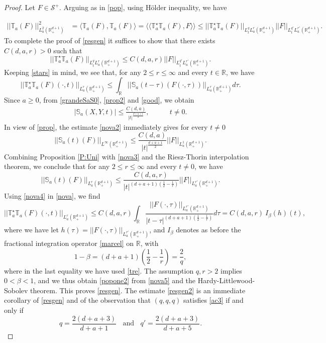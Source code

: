 \documentclass[11pt,letter]{amsart}
\def \RN {\mathbb{R}_+^{d+1}}
\def \R {\mathbb{R}}
\numberwithin{equation}{section}
\newcommand{\sa}{\langle}
\newcommand{\da}{\rangle}
\newcommand{\snn}{\mathscr S^+}
\numberwithin{equation}{section}
\begin{document}
\begin{proof}
Let $F\in \snn$. Arguing as in \eqref{pop}, using H\"older inequality, we have

\begin{align}\label{popone}
||\mathbb T_a(F)||^2_{L_a^2(\RN)} & = \sa \mathbb T_a(F),\mathbb T_a(F)\da = \sa\sa \mathbb T_a^\star \mathbb T_a(F),F\da\da \le ||\mathbb T_a^\star \mathbb T_a(F)||_{L^q_t L_a^r(\RN)} ||F||_{L^{q'}_t L^{r'}_a(\RN)}.
\end{align}
To complete the proof of \eqref{resgen} it suffices to show that there exists $C(d,a,r)>0$ such that 
\begin{equation}\label{popone2}
||\mathbb T_a^\star \mathbb T_a(F)||_{L^q_t L_a^r(\RN)} \le C(d,a,r) ||F||_{L^{q'}_t L^{r'}_a(\RN)}.
\end{equation}
Keeping \eqref{stars} in mind, we see that, for any $2\le r\le \infty$ and every $t\in \R$, we have 
\begin{equation}\label{nova}
||\mathbb T_a^\star \mathbb T_a(F)(\cdot,t)||_{L^r_a(\RN)} \le \int_\R ||\mathbb S_a(t-\tau)(F(\cdot,\tau))||_{L^r_a(\RN)} d\tau.
\end{equation}
Since $a\ge 0$, from \eqref{grandeSaS0}, \eqref{prop2} and \eqref{good}, we obtain
\begin{align}\label{nova2}
|\mathbb S_a(X,Y,t)|
\le 
\frac{C(d,a)}{|t|^{\frac{d+a+1}{2}}},
\qquad \ \ \ \ t\neq 0.
\end{align}
In view of \eqref{prop}, the estimate \eqref{nova2}  immediately gives for every $t\not= 0$
\begin{equation}\label{nova3}
||\mathbb S_a(t)(F)||_{L^\infty(\RN)} \le \frac{C(d,a)}{|t|^{\frac{d+a+1}{2}}} ||F||_{L^1_a(\RN)}.
\end{equation}
Combining Proposition \ref{P:Uni} with \eqref{nova3} and the Riesz-Thorin interpolation theorem, we conclude that for any $2\le r\le \infty$ and every $t\not= 0$, we have
\begin{equation}\label{nova4}
||\mathbb S_a(t)(F)||_{L^r_a(\RN)} \le \frac{C(d,a,r)}{|t|^{(d+a+1)(\frac{1}{2}-\frac 1r)}} ||F||_{L^{r'}_a(\RN)}.
\end{equation}
Using \eqref{nova4} in \eqref{nova}, we find
\begin{equation}\label{nova5}
||\mathbb T_a^\star \mathbb T_a(F)(\cdot,t)||_{L^r_a(\RN)} \le C(d,a,r) \int_\R \frac{||F(\cdot,\tau)||_{L^{r'}_a(\RN)}}{|t-\tau|^{(d+a+1)(\frac{1}{2}-\frac 1r)}} d\tau = C(d,a,r)\ I_\beta(h)(t),
\end{equation}
where we have let $h(\tau) = ||F(\cdot,\tau)||_{L^{r'}_a(\RN)}$, and $I_\beta$ denotes as before the fractional integration operator \eqref{marcel} on $\R$, with 
\[
1-\beta = (d+a+1)(\frac{1}{2}-\frac 1r)= \frac 2q,
\] 
where in the last equality we have used \eqref{tre}. The assumption $q, r>2$ implies $0<\beta<1$, and we thus obtain \eqref{popone2} from \eqref{nova5} and the Hardy-Littlewood-Sobolev theorem. This proves \eqref{resgen}. The estimate \eqref{resgen2} is an immediate corollary of \eqref{resgen} and of the observation that $(q,q,q)$ satisfies \eqref{ac3} if and only if 
\[
q = \frac{2(d+a+3)}{d+a+1}\ \ \ \ \text{and}\ \ \ \ q' = \frac{2(d+a+3)}{d+a+5}.
\]




\end{proof}
\end{document}
